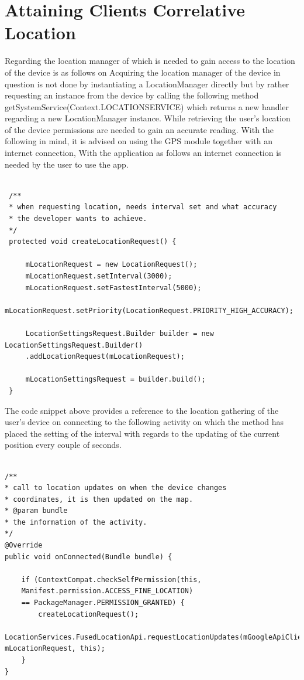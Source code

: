 \section{Attaining Clients Correlative Location}
Regarding the location manager of which is needed to gain access to the location of the device is as follows on Acquiring the location manager of the device in question is not done by instantiating a LocationManager directly but by rather requesting an instance from the device by calling the following method getSystemService(Context.LOCATION\textunderscore SERVICE) which returns a new handler regarding a new LocationManager instance. While retrieving the user's location of the device permissions are needed to gain an accurate reading. With the following in mind, it is advised on using the GPS module together with an internet connection, With the application as follows an internet connection is needed by the user to use the app.
\begin{lstlisting}[style=myCustomMatlabStyle, basicstyle=\small, breaklines, caption=Location Request Settings,captionpos=b]

 /**
 * when requesting location, needs interval set and what accuracy
 * the developer wants to achieve.
 */
 protected void createLocationRequest() {
     
     mLocationRequest = new LocationRequest();
     mLocationRequest.setInterval(3000);
     mLocationRequest.setFastestInterval(5000);
     mLocationRequest.setPriority(LocationRequest.PRIORITY_HIGH_ACCURACY);
     
     LocationSettingsRequest.Builder builder = new LocationSettingsRequest.Builder()
     .addLocationRequest(mLocationRequest);
     
     mLocationSettingsRequest = builder.build();
 }
\end{lstlisting}

\par
The code snippet above provides a reference to the location gathering of the user's device on connecting to the following activity on which the method has placed the setting of the interval with regards to the updating of the current position every couple of seconds.
\begin{lstlisting}[style=myCustomMatlabStyle, basicstyle=\small, breaklines, caption=OnConnected Location updates,captionpos=b]

/**
* call to location updates on when the device changes
* coordinates, it is then updated on the map.
* @param bundle
* the information of the activity.
*/
@Override
public void onConnected(Bundle bundle) {
    
    if (ContextCompat.checkSelfPermission(this,
    Manifest.permission.ACCESS_FINE_LOCATION)
    == PackageManager.PERMISSION_GRANTED) {
        createLocationRequest();
        LocationServices.FusedLocationApi.requestLocationUpdates(mGoogleApiClient, mLocationRequest, this);
    }
}
\end{lstlisting}

